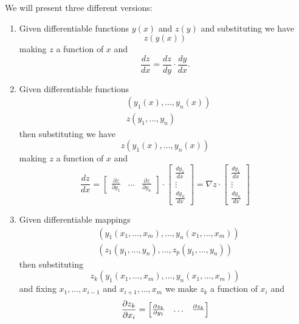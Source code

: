 \documentclass[handout]{ximera}
\begin{document}
\begin{theorem} We will present three different versions:
  \begin{enumerate}
  \item Given differentiable functions $y(x)$ and $z(y)$
    and substituting we have%
    \[
    z\left( y\left( x\right) \right) 
    \]
    making $z$ a function of $x$ and%
    \[
      \frac{dz}{dx}=\frac{dz}{dy}\cdot\frac{dy}{dx}. 
    \]
  \item Given differentiable functions
    \begin{align*}
      & \left( y_{1}\left( x\right) ,\ldots,y_{n}\left( x\right) \right) \\
      & z\left( y_{1},\ldots,y_{n}\right)
    \end{align*}
    then substituting we have%
    \[
    z\left( y_{1}\left( x\right) ,\ldots,y_{n}\left( x\right) \right) 
    \]
    making $z$ a function of $x$ and%
    \[
      \frac{dz}{dx}=\begin{bmatrix}
      \frac{\partial z}{\partial y_{1}} & \ldots & \frac{\partial z}{\partial y_{n}
      }
      \end{bmatrix}
      \cdot\begin{bmatrix}
      \frac{dy_{1}}{dx} \\ 
      \vdots \\ 
      \frac{dy_{n}}{dx}%
      \end{bmatrix}
      =\nabla z\cdot
      \begin{bmatrix}
        \frac{dy_{1}}{dx} \\ 
        \vdots \\ 
        \frac{dy_{n}}{dx}%
      \end{bmatrix}
      \]
\item Given differentiable mappings%
  \begin{align*}
    & \left( y_{1}\left( x_{1},\ldots,x_{m}\right) ,\ldots,y_{n}\left(
    x_{1},\ldots,x_{m}\right) \right) \\
    & \left( z_{1}\left( y_{1},\ldots,y_{n}\right) ,\ldots,z_{p}\left(
    y_{1},\ldots,y_{n}\right)\right)
  \end{align*}
  then substituting 
  \[
  z_{k}\left( y_{1}\left( x_{1},\ldots,x_{m}\right) ,\ldots,y_{n}\left(
  x_{1},\ldots,x_{m}\right) \right) 
  \]
  and fixing $x_{1},\ldots,x_{i-1}$ and $x_{i+1},\ldots,x_{m}$ we make
  $z_{k}$ a function of $x_{i}$ and%
  \[
  \frac{\partial z_{k}}{\partial x_{i}}= 
  \begin{bmatrix}
    \frac{\partial z_{k}}{\partial y_{1}} & \ldots & \frac{\partial z_{k}}{%
}
\end{bmatrix}\]
\end{enumerate}
\end{theorem}
\end{document}

